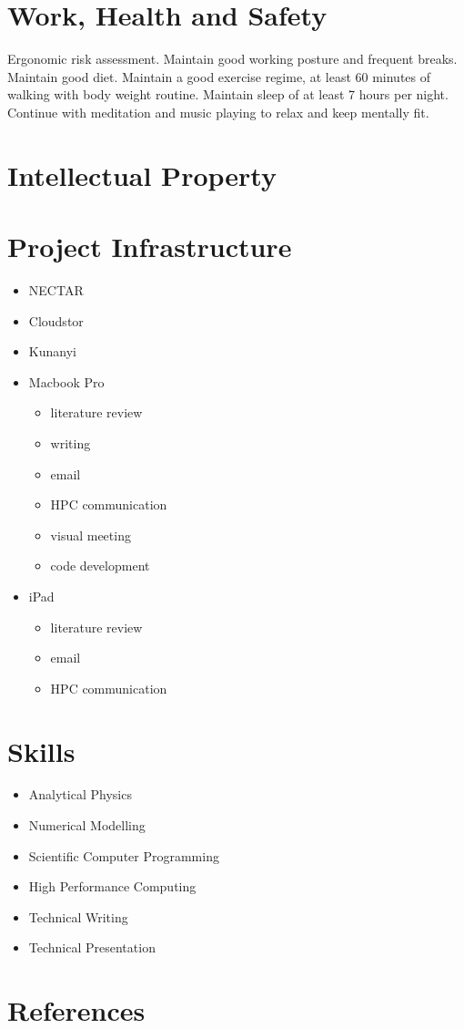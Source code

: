 \documentclass[11pt,a4paper]{article}
\begin{document}
\section*{Work, Health and Safety}
%
Ergonomic risk assessment. Maintain good working posture and frequent breaks. Maintain good diet. Maintain a good exercise regime, at least 60 minutes of walking with body weight routine. Maintain sleep of at least 7 hours per night. Continue with meditation and music playing to relax and keep mentally fit. 
\section*{Intellectual Property}
%
\doclicenseThis
\section*{Project Infrastructure}
%
\begin{itemize}
\item NECTAR
\item Cloudstor
\item Kunanyi
\item Macbook Pro
  \begin{itemize}
  \item literature review
  \item writing
  \item email
  \item HPC communication
  \item visual meeting
  \item code development
  \end{itemize}
\item iPad
  \begin{itemize}
  \item literature review
  \item email
  \item HPC communication
  \end{itemize}
\end{itemize}
\section*{Skills}
%
\begin{itemize}
\item Analytical Physics
\item Numerical Modelling
\item Scientific Computer Programming
\item High Performance Computing
\item Technical Writing
\item Technical Presentation
\end{itemize}
\section*{References}
%

\end{document}
